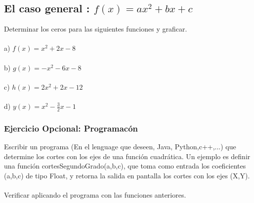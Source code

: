 \documentclass[11pt, a4paper]{article}
\begin{document}
\subsection*{El caso general : $f(x) = ax^2 + bx + c $} 
Determinar los ceros para las siguientes funciones y graficar. \\ \\
a) $ f(x) = x^2 + 2x -8 $ \\ \\
b) $ g(x) = -x^2 -6x -8 $ \\ \\
c) $ h(x) = 2x^2 + 2x - 12 $ \\ \\
d) $\displaystyle y(x) = x^2 - \frac{3}{2}x -1 $ 

\subsubsection*{Ejercicio Opcional: Programac\'on}
Escribir un programa (En el lenguage que deseen, Java, Python,c++,...) que determine los cortes con los ejes de una funci\'on cuadr\'atica. Un ejemplo es definir una funci\'on {\color{blue}cortesSegundoGrado(a,b,c)}, que toma como entrada los coeficientes  (a,b,c) de tipo Float, y retorna la salida en pantalla los cortes con los ejes (X,Y). \\ \\ 
Verificar aplicando el programa con las funciones anteriores. 
\end{document}
